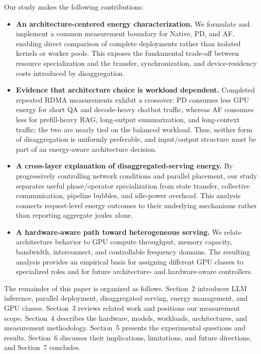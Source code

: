 Our study makes the following contributions:
\begin{itemize}
  \item \textbf{An architecture-centered energy characterization.} We formulate and implement a common measurement boundary for Native, PD, and AF, enabling direct comparison of complete deployments rather than isolated kernels or worker pools. This exposes the fundamental trade-off between resource specialization and the transfer, synchronization, and device-residency costs introduced by disaggregation.
  \item \textbf{Evidence that architecture choice is workload dependent.} Completed repeated RDMA measurements exhibit a crossover: PD consumes less GPU energy for short QA and decode-heavy chatbot traffic, whereas AF consumes less for prefill-heavy RAG, long-output summarization, and long-context traffic; the two are nearly tied on the balanced workload. Thus, neither form of disaggregation is uniformly preferable, and input/output structure must be part of an energy-aware architecture decision.
  \item \textbf{A cross-layer explanation of disaggregated-serving energy.} By progressively controlling network conditions and parallel placement, our study separates useful phase/operator specialization from state transfer, collective communication, pipeline bubbles, and idle-power overhead. This analysis connects request-level energy outcomes to their underlying mechanisms rather than reporting aggregate joules alone.
  \item \textbf{A hardware-aware path toward heterogeneous serving.} We relate architecture behavior to GPU compute throughput, memory capacity, bandwidth, interconnect, and controllable frequency domains. The resulting analysis provides an empirical basis for assigning different GPU classes to specialized roles and for future architecture- and hardware-aware controllers.
\end{itemize}

The remainder of this paper is organized as follows. Section~2 introduces LLM inference, parallel deployment, disaggregated serving, energy management, and GPU classes. Section~3 reviews related work and positions our measurement scope. Section~4 describes the hardware, models, workloads, architectures, and measurement methodology. Section~5 presents the experimental questions and results. Section~6 discusses their implications, limitations, and future directions, and Section~7 concludes.
